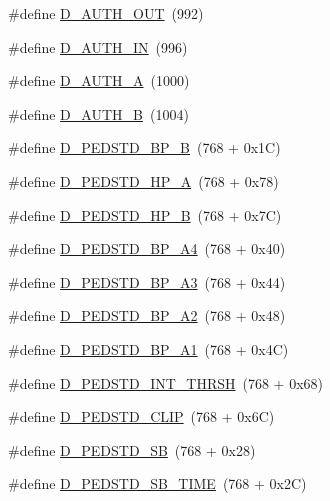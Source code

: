 \begin{DoxyCompactItemize}
\item 
\#define \hyperlink{group___d_r_i_v_e_r_s_gafcd825024b1b4f2dd4570e897c3fe24e}{D\+\_\+\+A\+U\+T\+H\+\_\+\+O\+UT}~(992)
\item 
\#define \hyperlink{group___d_r_i_v_e_r_s_gad59a17a973be28ebc0d0bc3ae1e3316f}{D\+\_\+\+A\+U\+T\+H\+\_\+\+IN}~(996)
\item 
\#define \hyperlink{group___d_r_i_v_e_r_s_gaf2eaee2b8c50adbd556a815d7ab795e9}{D\+\_\+\+A\+U\+T\+H\+\_\+A}~(1000)
\item 
\#define \hyperlink{group___d_r_i_v_e_r_s_ga7ee552ff37e87403b24788c2b8e80ce6}{D\+\_\+\+A\+U\+T\+H\+\_\+B}~(1004)
\item 
\#define \hyperlink{group___d_r_i_v_e_r_s_ga2c2d27ad76c61cf19da3460f810eefb1}{D\+\_\+\+P\+E\+D\+S\+T\+D\+\_\+\+B\+P\+\_\+B}~(768 + 0x1\+C)
\item 
\#define \hyperlink{group___d_r_i_v_e_r_s_ga14795bbdfea8a4d5961d2e0d0affe162}{D\+\_\+\+P\+E\+D\+S\+T\+D\+\_\+\+H\+P\+\_\+A}~(768 + 0x78)
\item 
\#define \hyperlink{group___d_r_i_v_e_r_s_ga36c0d5ca76fbb5df31ec8ca0a26db835}{D\+\_\+\+P\+E\+D\+S\+T\+D\+\_\+\+H\+P\+\_\+B}~(768 + 0x7\+C)
\item 
\#define \hyperlink{group___d_r_i_v_e_r_s_gac2bece455bcecb189a347b6c0edf2b6f}{D\+\_\+\+P\+E\+D\+S\+T\+D\+\_\+\+B\+P\+\_\+\+A4}~(768 + 0x40)
\item 
\#define \hyperlink{group___d_r_i_v_e_r_s_ga41557d8ab6be78f157aa4770d5123235}{D\+\_\+\+P\+E\+D\+S\+T\+D\+\_\+\+B\+P\+\_\+\+A3}~(768 + 0x44)
\item 
\#define \hyperlink{group___d_r_i_v_e_r_s_ga000da9f0c92ec1a103f8e1c50e7e61fd}{D\+\_\+\+P\+E\+D\+S\+T\+D\+\_\+\+B\+P\+\_\+\+A2}~(768 + 0x48)
\item 
\#define \hyperlink{group___d_r_i_v_e_r_s_ga6c42f0b2097fe55659dc5ec653681d50}{D\+\_\+\+P\+E\+D\+S\+T\+D\+\_\+\+B\+P\+\_\+\+A1}~(768 + 0x4\+C)
\item 
\#define \hyperlink{group___d_r_i_v_e_r_s_ga35d9c5ca325de3055539cdae8e5b497c}{D\+\_\+\+P\+E\+D\+S\+T\+D\+\_\+\+I\+N\+T\+\_\+\+T\+H\+R\+SH}~(768 + 0x68)
\item 
\#define \hyperlink{group___d_r_i_v_e_r_s_ga211abccbe885d02059206ca4da711b54}{D\+\_\+\+P\+E\+D\+S\+T\+D\+\_\+\+C\+L\+IP}~(768 + 0x6\+C)
\item 
\#define \hyperlink{group___d_r_i_v_e_r_s_ga50a1a44c925cadaa77b3b88e08db7e08}{D\+\_\+\+P\+E\+D\+S\+T\+D\+\_\+\+SB}~(768 + 0x28)
\item 
\#define \hyperlink{group___d_r_i_v_e_r_s_ga0d3790675bcf0bbb837f2834523aca11}{D\+\_\+\+P\+E\+D\+S\+T\+D\+\_\+\+S\+B\+\_\+\+T\+I\+ME}~(768 + 0x2\+C)

\end{DoxyCompactItemize}
